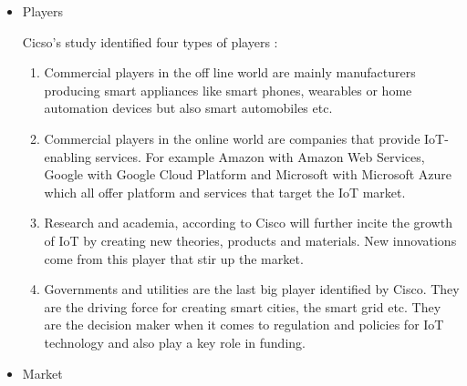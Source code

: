 		\begin{itemize}
			\item Players

		Cicso's study identified four types of players \cite{cisco}:

		\begin{enumerate}

			\item Commercial players in the off line world are mainly manufacturers producing smart appliances like smart phones, wearables or home automation devices but also smart automobiles etc.

			\item Commercial players in the online world are companies that provide IoT-enabling services. For example Amazon with Amazon Web Services, Google with Google Cloud Platform and Microsoft with Microsoft Azure which all offer platform and services that target the IoT market.

			\item Research and academia, according to Cisco will further incite the growth of IoT by creating new theories, products and materials. New innovations come from this player that stir up the market.

			\item Governments and utilities are the last big player identified by Cisco. They are the driving force for creating smart cities, the smart grid etc. They are the decision maker when it comes to regulation and policies for IoT technology and also play a key role in funding.

		\end{enumerate}
		
		\item Market


\end{itemize}
